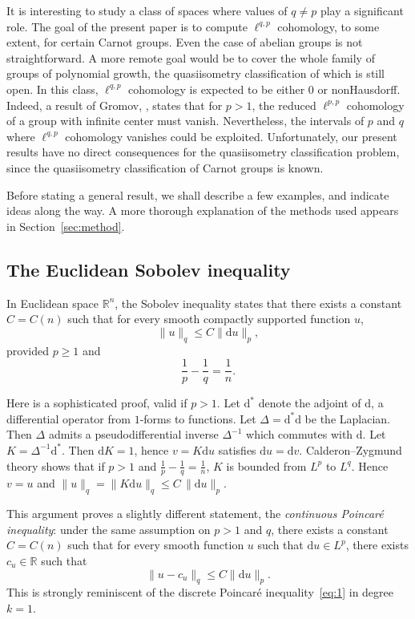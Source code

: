 \documentclass[11pt]{article}
\theoremstyle{definition}
\numberwithin{equation}{section}
\numberwithin{figure}{section}
\numberwithin{table}{section}
\newcommand{\R}{\mathbb{R}}
\newcommand{\dd}{\mathrm{d}}
\newcommand{\du}{\dd u}
\newcommand{\dv}{\dd v}
\newcommand{\dK}{\dd K}
\begin{document}
It is interesting to study a class of spaces where values of $q\not=p$ play a significant role. The goal of the present paper is to compute $\ell^{q,p}$ cohomology, to some extent, for certain Carnot groups. Even the case of abelian groups is not straightforward. A more remote goal would be to cover the whole family of groups of polynomial growth, the quasiisometry classification of which is still open. In this class, $\ell^{q,p}$ cohomology is expected to be either $0$ or nonHausdorff. Indeed, a result of Gromov, \cite[8.C]{Gromov}, states that for $p>1$, the reduced $\ell^{p,p}$ cohomology of a group with infinite center must vanish. Nevertheless, the intervals of $p$ and $q$ where $\ell^{q,p}$ cohomology vanishes could be exploited. Unfortunately, our present results have no direct consequences for the quasiisometry classification problem, since the quasiisometry classification of Carnot groups is known.

Before stating a general result, we shall describe a few examples, and indicate ideas along the way. A more thorough explanation of the methods used appears in Section~\ref{sec:method}.

\subsection{The Euclidean Sobolev inequality}

In Euclidean space $\R^n$, the Sobolev inequality states that there exists a constant $C=C(n)$ such that for every smooth compactly supported function $u$,
\begin{equation}\label{eq:2}
\|u\|_q \leq C \|\du\|_p,
\end{equation}
provided $p\geq 1$ and
\begin{equation*}
\frac{1}{p}-\frac{1}{q}=\frac{1}{n}.
\end{equation*}

Here is a sophisticated proof, valid if $p>1$. Let $\dd^*$ denote the adjoint of $\dd$, a differential operator from $1$-forms to functions. Let $\Delta=\dd^*\dd$ be the Laplacian. Then $\Delta$ admits a pseudodifferential inverse $\Delta^{-1}$ which commutes with $\dd$. Let $K=\Delta^{-1}\dd^*$. Then $\dK=1$, hence $v=K\du$ satisfies $\du=\dv$. Calderon--Zygmund theory shows that if $p>1$ and $\frac{1}{p}-\frac{1}{q}=\frac{1}{n}$, $K$ is bounded from $L^p$ to $L^q$. Hence $v=u$ and $\|u\|_q=\|K\du\|_q\leq C\,\|\du\|_p$.

This argument proves a slightly different statement, the \emph{continuous Poincar\'e inequality}: under the same assumption on $p>1$ and $q$, there exists a constant $C=C(n)$ such that for every smooth function $u$ such that $\du\in L^p$, there exists $c_u\in\R$ such that
\begin{equation}\label{eq:3}
\|u-c_u\|_q \leq C \|\du\|_p.
\end{equation}
This is strongly reminiscent of the discrete Poincar\'e inequality~\eqref{eq:1} in degree $k=1$.
\end{document}

